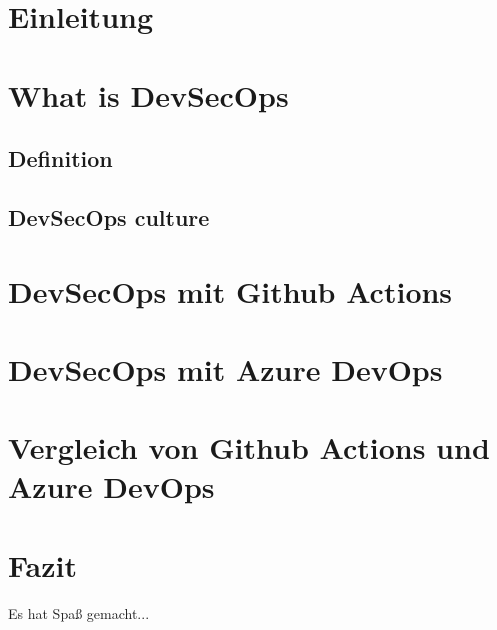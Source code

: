 \chapter{Einleitung}
\chapter{What is DevSecOps}
\section{Definition}
\section{DevSecOps culture}
\chapter{DevSecOps mit Github Actions}

\chapter{DevSecOps mit Azure DevOps}

\chapter{Vergleich von Github Actions und Azure DevOps}

\chapter{Fazit}
Es hat Spaß gemacht...